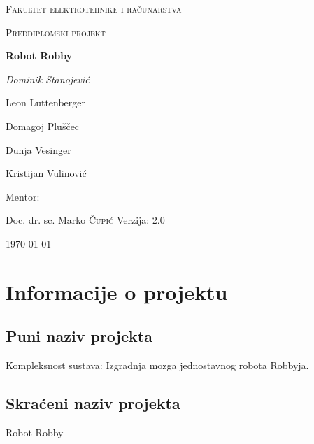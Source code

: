 \documentclass[times, utf8, numeric]{fer}
\begin{document}
\begin{titlepage}
	\centering
	{\scshape\LARGE Fakultet elektrotehnike i računarstva \par}
	\vspace{1cm}
	{\scshape\Large Preddiplomski projekt\par}
	\vspace{1.5cm}
	{\huge\bfseries Robot Robby\par}
	\vspace{2cm}
	{\Large\itshape
	Dominik Stanojević \par
	Leon Luttenberger \par
	Domagoj Pluščec \par
	Dunja Vesinger \par
	Kristijan Vulinović\par}
	\vfill
	Mentor:\par
	Doc. dr. sc. Marko \textsc{Čupić}
	\vfill	
	Verzija: 2.0
	\vfill

	{\large \today\par}
\end{titlepage}

\pagebreak
\tableofcontents

\pagebreak
{}

\chapter{Informacije o projektu}
\section{Puni naziv projekta}
Kompleksnost sustava: Izgradnja mozga jednostavnog robota Robbyja.

\section{Skraćeni naziv projekta}
Robot Robby
\end{document}
